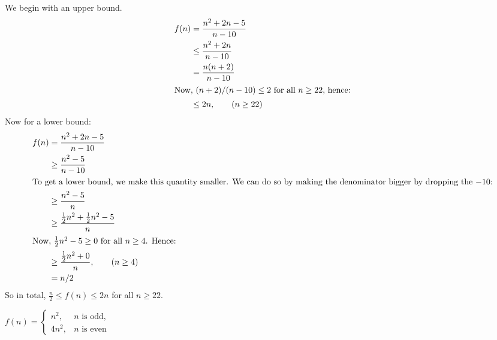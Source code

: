 \begin{prob}
\begin{subprobset}
\begin{subprob}
\begin{soln}
                We begin with an upper bound.
                \begin{align*}
                    f(n)
                    &=
                        \frac{n^2 + 2n - 5}{n - 10}
                        \\
                    &\leq
                        \frac{n^2 + 2n}{n - 10}
                        \\
                    &=
                        \frac{n(n + 2)}{n - 10}
                        \\
                        \intertext{Now, $(n+2)/(n-10) \leq 2$ for all $n \geq 22$, hence:}
                    &\leq
                        2 n, \qquad (n \geq 22)
                        \\
                \end{align*}
                Now for a lower bound:
                \begin{align*}
                    f(n)
                    &=
                        \frac{n^2 + 2n - 5}{n - 10}
                        \\
                    &\geq
                        \frac{n^2 - 5}{n - 10}
                        \\
                    \intertext{To get a lower bound, we make this
                    quantity smaller. We can do so by making the
                    denominator bigger by dropping the $-10$:}
                    &\geq
                        \frac{n^2 - 5}{n}
                        \\
                    &\geq
                    \frac{\frac{1}{2}n^2  + \frac{1}{2}n^2 - 5}{n}
                        \\
                        \intertext{Now, $\frac{1}{2}n^2 -5 \geq 0$ for all $n \geq 4$. Hence:}
                    &\geq
                \frac{\frac{1}{2}n^2  + 0}{n}, \qquad (n \geq 4)
                        \\
                    &= n/2
                \end{align*}
                So in total, $\frac{n}{2} \leq f(n) \leq 2n$ for all $n \geq 22$.
            \end{soln}
            
        \end{subprob}

        \begin{subprob}
            $
            \displaystyle
            f(n) = 
            \begin{cases}
                n^2, & n \text{ is odd},\\
                4n^2, & n \text{ is even}
            \end{cases}
            $


\end{subprob}
\end{subprobset}
\end{prob}

